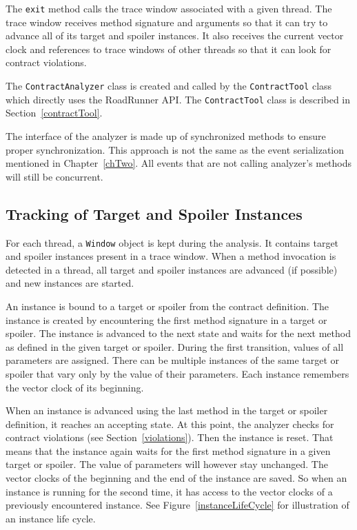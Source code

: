 The \texttt{exit} method calls the trace window associated with a given thread.
The trace window receives method signature and arguments so that it can try to
advance all of its target and spoiler instances. It also receives the current
vector clock and references to trace windows of other threads so that it can
look for contract violations.

The \texttt{ContractAnalyzer} class is created and called by the
\texttt{ContractTool} class which directly uses the RoadRunner API. The
\texttt{ContractTool} class is described in Section~\ref{contractTool}.

The interface of the analyzer is made up of synchronized methods to ensure
proper synchronization. This approach is not the same as the event serialization
mentioned in Chapter~\ref{chTwo}. All events that are not calling analyzer's
methods will still be concurrent.

\subsection{Tracking of Target and Spoiler Instances}

For each thread, a \texttt{Window} object is kept during the analysis. It
contains target and spoiler instances present in a trace window. When a method
invocation is detected in a thread, all target and spoiler instances are
advanced (if possible) and new instances are started.

An instance is bound to a target or spoiler from the contract definition. The
instance is created by encountering the first method signature in a target or
spoiler. The instance is advanced to the next state and waits for the next
method as defined in the given target or spoiler. During the first transition,
values of all parameters are assigned. There can be multiple instances of the
same target or spoiler that vary only by the value of their parameters. Each
instance remembers the vector clock of its beginning.

When an instance is advanced using the last method in the target or spoiler
definition, it reaches an accepting state. At this point, the analyzer checks
for contract violations (see Section~\ref{violations}). Then the instance is
reset. That means that the instance again waits for the first method signature
in a given target or spoiler. The value of parameters will however stay
unchanged. The vector clocks of the beginning and the end of the instance are
saved. So when an instance is running for the second time, it has access to the
vector clocks of a previously encountered instance. See
Figure~\ref{instanceLifeCycle} for illustration of an instance life cycle.

